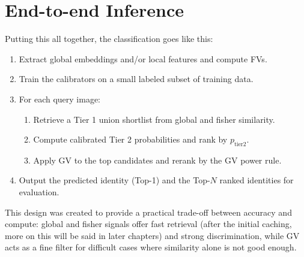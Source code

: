 \section{End-to-end Inference}
Putting this all together, the classification goes like this:
\begin{enumerate}
    \item Extract global embeddings and/or local features and compute FVs.
    \item Train the calibrators on a small labeled subset of training data.
    \item For each query image:
    \begin{enumerate}
        \item Retrieve a Tier 1 union shortlist from global and fisher similarity.
        \item Compute calibrated Tier 2 probabilities and rank by $p_{\text{tier2}}$.
        \item Apply GV to the top candidates and rerank by the GV power rule.
    \end{enumerate}
    \item Output the predicted identity (Top-1) and the Top-$N$ ranked identities for evaluation.
\end{enumerate}



This design was created to provide a practical trade-off between accuracy and compute: global and fisher signals offer fast retrieval (after the initial caching, more on this will be said in later chapters) and strong discrimination, while GV acts as a fine filter for difficult cases where similarity alone is not good enough. 